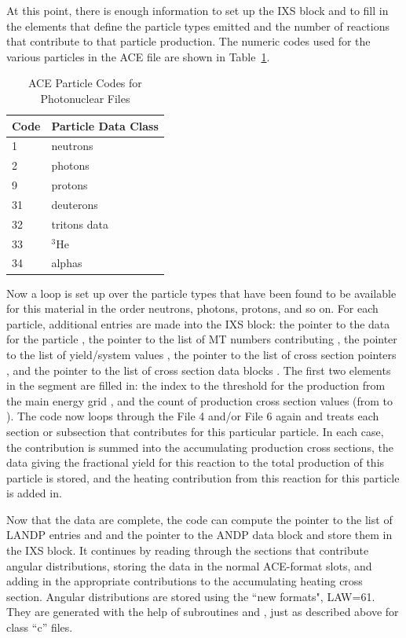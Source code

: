 At this point, there is enough information to set up the IXS block
and to fill in the elements that define the particle types emitted
and the number of reactions that contribute to that particle
production.  The numeric codes used for the various particles in
the ACE file are shown in Table~\ref{pcodes}.

\begin{table}[thb]
\caption[ACE particle codes for photonuclear files]{ACE Particle Codes
 for Photonuclear Files}
\label{pcodes}
\begin{center}
\begin{tabular}{ll}
Code & Particle Data  Class \\
\hline
  1  &  neutrons \\
  2  &  photons \\
  9  &  protons \\
  31  &  deuterons \\
  32  &  tritons data \\
  33  &  $^{3}$He \\
  34  &  alphas \\
\hline
\end{tabular}
\end{center}
\end{table}

Now a loop is set up over the particle types that have been found to
be available for this material in the order neutrons, photons, protons,
and so on.  For each particle, additional entries are made into the
IXS block: the pointer to the data for the particle ,
the pointer to the list of MT numbers contributing , the pointer
to the list of yield/system values , the pointer to the list
of cross section pointers , and the pointer to the list of
cross section data blocks .  The first two elements in the
 segment are filled in: the index to the threshold for the
production from the main energy grid , and the count of
production cross section values (from  to ).  The
code now loops through the File 4 and/or File 6 again and treats each
section or subsection that contributes for this particular particle.  In
each case, the contribution is summed into the accumulating production
cross sections, the data giving the fractional yield for this reaction
to the total production of this particle is stored, and the heating
contribution from this reaction for this particle is added in.

Now that the  data are complete, the code can compute the
pointer to the list of LANDP entries and and the pointer to the ANDP
data block and store them in the IXS block.  It continues by reading
through the sections that contribute angular distributions, storing
the data in the normal ACE-format slots, and adding in the appropriate
contributions to the accumulating heating cross section.  Angular
distributions are stored using the ``new formats", LAW=61.  They are
generated with the help of subroutines  and
, just as described above for class ``c'' files.

